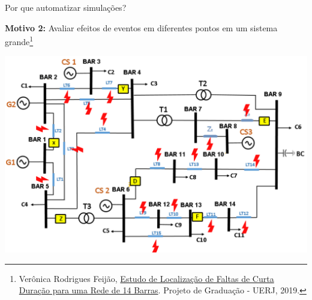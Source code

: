 \begin{frame}{Por que automatizar simulações?}
\centering

\textbf{Motivo 2:} Avaliar efeitos de eventos em diferentes pontos em um sistema grande\footnote[frame]{\tiny Verônica Rodrigues Feijão, \href{https://drive.google.com/file/d/1xZGZLela_iNW0KIjTQ59YyCL1-sb16IO/view}{Estudo de Localização de Faltas de Curta Duração para uma Rede de 14 Barras}. Projeto de Graduação -  UERJ, 2019.}

\includegraphics[width=0.6\linewidth]{./figuras/Automacao/ex_curto}

\end{frame}





